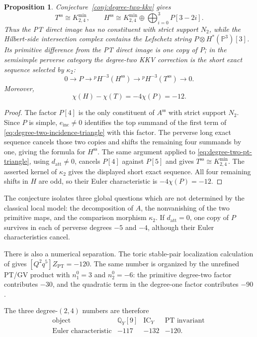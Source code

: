 \documentclass[11pt,reqno]{amsart}
\newtheorem{proposition}[theorem]{Proposition}
\theoremstyle{definition}
\newcommand{\Q}{\mathbb Q}
\newcommand{\Pp}{\mathbb P}
\newcommand{\IC}{\operatorname{IC}}
\newcommand{\PT}{\operatorname{PT}}
\begin{document}
\begin{proposition}\label{prop:degree-two-kkv-reduction}
Conjecture~\ref{conj:degree-two-kkv} gives
\[
 T^{\mathrm{ss}}\cong K_{2,4}^{\min},\qquad
 H^{\mathrm{ss}}\cong K_{2,4}^{\min}
 \oplus\bigoplus_{i=0}^3P[3-2i].
\]
Thus the PT direct image has no constituent with strict support $N_2$, while
the Hilbert-side intersection complex contains the Lefschetz string
$P\otimes H^*(\Pp^3)[3]$.  Its primitive difference from the PT direct
image is one copy of $P$; in the semisimple perverse category the degree-two
KKV correction is the short exact sequence selected by $\kappa_2$:
\[
 0\longrightarrow P\longrightarrow
 {}^pH^{-3}(H^{\mathrm{ss}})
 \longrightarrow{}^pH^{-3}(T^{\mathrm{ss}})
 \longrightarrow0.
\]
Moreover,
\[
 \chi(H)-\chi(T)=-4\chi(P)=-12.
\]
\end{proposition}

\begin{proof}
The factor $P[4]$ is the only constituent of $A^{\mathrm{ss}}$ with strict
support $N_2$.  Since $P$ is simple, $e_{\mathrm{inc}}\ne0$ identifies the top summand of
the first term of \eqref{eq:degree-two-incidence-triangle} with this factor.
The perverse long exact sequence cancels those two copies and shifts the
remaining four summands by one, giving the formula for $H^{\mathrm{ss}}$.
The same argument applied to \eqref{eq:degree-two-pt-triangle}, using
$d_{\mathrm{att}}\ne0$, cancels $P[4]$ against $P[5]$ and gives
$T^{\mathrm{ss}}\cong K_{2,4}^{\min}$.  The asserted kernel of $\kappa_2$
gives the displayed short exact sequence.  All four remaining shifts in $H$
are odd, so their Euler characteristic is $-4\chi(P)=-12$.
\end{proof}

The conjecture isolates three global questions which are not determined by
the classical local model: the decomposition of $A$, the nonvanishing of the two
primitive maps, and the comparison morphism $\kappa_2$.  If
$d_{\mathrm{att}}=0$, one copy of $P$ survives in each of perverse
degrees $-5$ and $-4$, although their Euler characteristics cancel.

There is also a numerical separation.  The toric stable-pair localization
calculation of \cite[Sections~6 and 8]{CKK} gives
$[Q^2q^5]Z_{\PT}=-120$.  The same number is organized by the unrefined
PT/GV product with $n_1^0=3$ and $n_2^0=-6$: the primitive degree-two
factor contributes $-30$, and the quadratic term in the degree-one factor
contributes $-90$.

The three degree-$(2,4)$ numbers are therefore
\[
\begin{array}{c|ccc}
\text{object}&\Q_Y[9]&\IC_Y&\text{PT invariant}\ \\ \hline
\text{Euler characteristic}&-117&-132&-120.
\end{array}
\]
\end{document}
